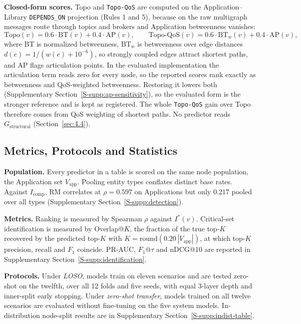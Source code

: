 \documentclass[preprint,3p]{elsarticle}
\begin{document}
\noindent\textbf{Closed-form scores.} Topo and \texttt{Topo-QoS} are computed on the Application--Library \texttt{DEPENDS\_ON} projection (Rules 1 and 5), because on the raw multigraph messages route through topics and brokers and Application betweenness vanishes:
\begin{equation}
\text{Topo}(v) = 0.6 \cdot \text{BT}(v) + 0.4 \cdot \text{AP}(v),
\qquad
\text{Topo-QoS}(v) = 0.6 \cdot \text{BT}_{w}(v) + 0.4 \cdot \text{AP}(v),
\end{equation}
where BT is normalized betweenness, $\text{BT}_{w}$ is betweenness over edge distances $d(e) = 1/(w(e) + 10^{-6})$, so strongly coupled edges attract shortest paths, and AP flags articulation points. In the evaluated implementation the articulation term reads zero for every node, so the reported scores rank exactly as betweenness and QoS-weighted betweenness. Restoring it lowers both (Supplementary Section~\ref{S-supp:ap-sensitivity}), so the evaluated form is the stronger reference and is kept as registered. The whole \texttt{Topo-QoS} gain over Topo therefore comes from QoS weighting of shortest paths. No predictor reads $G_{\text{structural}}$ (Section~\ref{sec:4.4}).

\subsection{Metrics, Protocols and Statistics}
\label{sec:6.3}

\noindent\textbf{Population.} Every predictor in a table is scored on the same node population, the Application set $V_{\text{app}}$. Pooling entity types conflates distinct base rates. Against $I_{\text{comp}}$, RM correlates at $\rho = 0.597$ on Applications but only $0.217$ pooled over all types (Supplementary Section~\ref{S-supp:detection}).

\noindent\textbf{Metrics.} Ranking is measured by Spearman $\rho$ against $I^*(v)$. Critical-set identification is measured by Overlap@$K$, the fraction of the true top-$K$ recovered by the predicted top-$K$ with $K = \text{round}(0.20\,|V_{\text{app}}|)$, at which top-$K$ precision, recall and $F_1$ coincide. PR-AUC, $F_1@\tau$ and nDCG@10 are reported in Supplementary Section~\ref{S-supp:identification}.

\noindent\textbf{Protocols.} Under \emph{LOSO}, models train on eleven scenarios and are tested zero-shot on the twelfth, over all 12 folds and five seeds, with equal 3-layer depth and inner-split early stopping. Under \emph{zero-shot transfer}, models trained on all twelve scenarios are evaluated without fine-tuning on the five system models. In-distribution node-split results are in Supplementary Section~\ref{S-supp:indist-table}.
\end{document}
